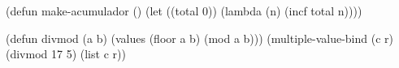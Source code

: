 \begin{examplebox}[title=Contador con estado encapsulado]
\begin{lispcode}
(defun make-acumulador ()
  (let ((total 0)) (lambda (n) (incf total n))))
\end{lispcode}
\end{examplebox}

\begin{examplebox}[title=Divmod con múltiples valores]
\begin{lispcode}
(defun divmod (a b) (values (floor a b) (mod a b)))
(multiple-value-bind (c r) (divmod 17 5) (list c r))
\end{lispcode}
\end{examplebox}

